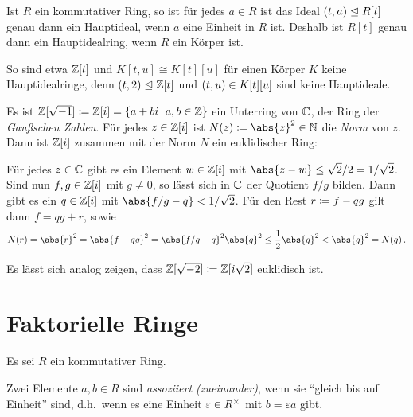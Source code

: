 \begin{remark}
  Ist $R$ ein kommutativer Ring, so ist für jedes $a \in R$ ist das Ideal $(t, a) \mathrel{\trianglelefteq} R[t]$ genau dann ein Hauptideal, wenn $a$ eine Einheit in $R$ ist.
  Deshalb ist $R[t]$ genau dann ein Hauptidealring, wenn $R$ ein Körper ist.
  
  So sind etwa $\mathbb{Z}[t]$ und $K[t,u] \cong K[t][u]$ für einen Körper $K$ keine Hauptidealringe, denn $(t, 2) \mathrel{\trianglelefteq} \mathbb{Z}[t]$ und $(t, u) \in K[t][u]$ sind keine Hauptideale.
\end{remark}

\begin{example}
  Es ist $\Integer[\sqrt{-1}] \defined \Integer[i] = \{a + bi \suchthat a, b \in \Integer\}$ ein Unterring von $\mathbb{C}$, der Ring der \emph{Gaußschen Zahlen}.
  Für jedes $z \in \mathbb{Z}[i]$ ist $N(z) \defined \abs{z}^2 \in \Natural$ die \emph{Norm} von $z$.
  Dann ist $\mathbb{Z}[i]$ zusammen mit der Norm $N$ ein euklidischer Ring:
  
  Für jedes $z \in \mathbb{C}$ gibt es ein Element $w \in \mathbb{Z}[i]$ mit $\abs{z-w} \leq \sqrt{2}/2 = 1/\sqrt{2}$.
  Sind nun $f, g \in \mathbb{Z}[i]$ mit $g \neq 0$, so lässt sich in $\mathbb{C}$ der Quotient $f/g$ bilden.
  Dann gibt es ein $q \in \mathbb{Z}[i]$ mit $\abs{f/g - q} < 1/\sqrt{2}$.
  Für den Rest $r \coloneqq f - qg$ gilt dann $f = qg + r$, sowie
  \[
          N(r)
    =     \abs{r}^2
    =     \abs{f - qg}^2
    =     \abs{f/g - q}^2 \abs{g}^2
    \leq  \frac{1}{2} \abs{g}^2
    <     \abs{g}^2
    =     N(g) \,.
  \]
\end{example}

\begin{remark}
  Es lässt sich analog zeigen, dass $\mathbb{Z}[\sqrt{-2}] \coloneqq \mathbb{Z}[i\sqrt{2}]$ euklidisch ist.
\end{remark}





\section{Faktorielle Ringe}

Es sei $R$ ein kommutativer Ring.

\begin{definition}
  Zwei Elemente $a, b \in R$ sind \emph{assoziiert \textup(zueinander\textup)}, wenn sie \enquote{gleich bis auf Einheit} sind, d.h.\ wenn es eine Einheit $\varepsilon \in R^{\times}$ mit $b = \varepsilon a$ gibt.
\end{definition}

